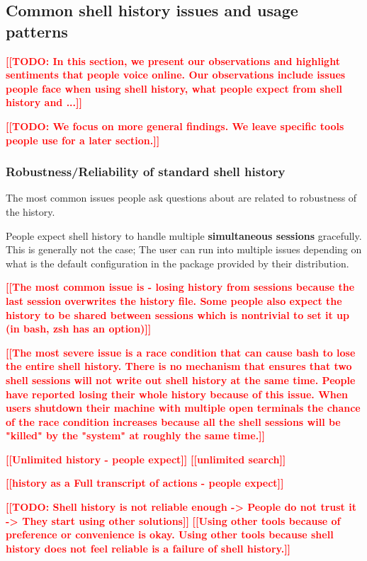 \documentclass[thesis=M,english]{FITthesis}[2012/10/20]
\newcommand{\todotext}[1]{\textcolor{red}{\textbf{[[#1]]}}}
\begin{document}
\subsection{Common shell history issues and usage patterns}

\todotext{TODO: In this section, we present our observations and highlight sentiments that people voice online. Our observations include issues people face when using shell history, what people expect from shell history and ...}

\todotext{TODO: We focus on more general findings. We leave specific tools people use for a later section.}


\subsubsection*{Robustness/Reliability of standard shell history}

The most common issues people ask questions about are related to robustness of the history.

People expect shell history to handle multiple \textbf{simultaneous sessions} gracefully. This is generally not the case; The user can run into multiple issues depending on what is the default configuration in the package provided by their distribution.

\todotext{The most common issue is - losing history from sessions because the last session overwrites the history file. Some people also expect the history to be shared between sessions which is nontrivial to set it up (in bash, zsh has an option)}

\todotext{The most severe issue is a race condition that can cause bash to lose the entire shell history. There is no mechanism that ensures that two shell sessions will not write out shell history at the same time. People have reported losing their whole history because of this issue. When users shutdown their machine with multiple open terminals the chance of the race condition increases because all the shell sessions will be "killed" by the "system" at roughly the same time.}

\todotext{Unlimited history - people expect}
\todotext{unlimited search}


\todotext{history as a Full transcript of actions - people expect}


\todotext{TODO: Shell history is not reliable enough -> People do not trust it -> They start using other solutions}
\todotext{Using other tools because of preference or convenience is okay. Using other tools because shell history does not feel reliable is a failure of shell history.}
\end{document}
